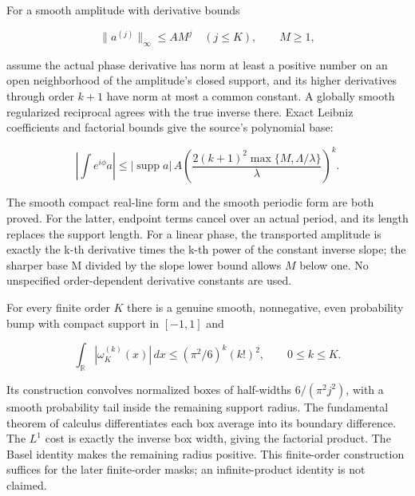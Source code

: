 \documentclass[11pt]{article}
\begin{document}
For a smooth amplitude with derivative bounds

\[
\|a^{(j)}\|_\infty\le A M^j\quad(j\le K),\qquad M\ge1,
\]


assume the actual phase derivative has norm at least a positive number
on an open neighborhood of the amplitude's closed support, and its higher
derivatives through order $k+1$ have norm at most a common constant. A globally
smooth regularized reciprocal agrees with the true inverse there. Exact
Leibniz coefficients and factorial bounds give the source's polynomial base:

\[
\left|\int e^{i\phi}a\right|
\le |\operatorname{supp}a|\,A
\left(\frac{2(k+1)^2\max\{M,\Lambda/\lambda\}}{\lambda}\right)^k.
\]


The smooth compact real-line form and the smooth periodic form are both
proved. For the latter, endpoint terms cancel over an actual period, and its
length replaces the support length. For a linear phase, the transported
amplitude is exactly the k-th derivative times the k-th power of the constant
inverse slope; the sharper base M divided by the slope lower bound allows
$M$ below one. No unspecified order-dependent derivative constants are used.

For every finite order $K$ there is a genuine smooth, nonnegative, even
probability bump with compact support in $[-1,1]$ and

\[
\int_{\mathbb R}|\omega_K^{(k)}(x)|\,dx
\le(\pi^2/6)^k(k!)^2,\qquad 0\le k\le K.
\]


Its construction convolves normalized boxes of half-widths $6/(\pi^2 j^2)$,
with a smooth probability tail inside the remaining
support radius. The fundamental theorem of calculus differentiates each box
average into its boundary difference. The $L^1$ cost is exactly the inverse box
width, giving the factorial product. The Basel identity makes the remaining
radius positive. This finite-order construction suffices for the later
finite-order masks; an infinite-product identity is not claimed.

\newpage
\end{document}
